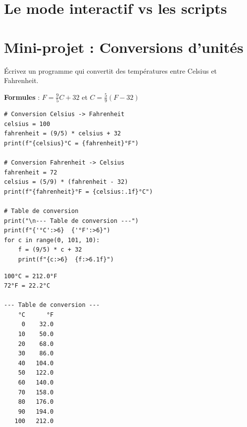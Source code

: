 \section{Le mode interactif vs les scripts}

\begin{center}
\end{center}

\section{Mini-projet : Conversions d'unit\'es}

\begin{projet}
\'Ecrivez un programme qui convertit des temp\'eratures entre Celsius et Fahrenheit.

\textbf{Formules} : $F = \frac{9}{5}C + 32$ et $C = \frac{5}{9}(F - 32)$

\begin{codeblock}[title=\textbf{Python --- Convertisseur}]
\begin{verbatim}
# Conversion Celsius -> Fahrenheit
celsius = 100
fahrenheit = (9/5) * celsius + 32
print(f"{celsius}°C = {fahrenheit}°F")

# Conversion Fahrenheit -> Celsius
fahrenheit = 72
celsius = (5/9) * (fahrenheit - 32)
print(f"{fahrenheit}°F = {celsius:.1f}°C")

# Table de conversion
print("\n--- Table de conversion ---")
print(f"{'°C':>6}  {'°F':>6}")
for c in range(0, 101, 10):
    f = (9/5) * c + 32
    print(f"{c:>6}  {f:>6.1f}")
\end{verbatim}
\end{codeblock}

\begin{codeoutput}
\begin{verbatim}
100°C = 212.0°F
72°F = 22.2°C

--- Table de conversion ---
    °C      °F
     0    32.0
    10    50.0
    20    68.0
    30    86.0
    40   104.0
    50   122.0
    60   140.0
    70   158.0
    80   176.0
    90   194.0
   100   212.0
\end{verbatim}
\end{codeoutput}
\end{projet}

